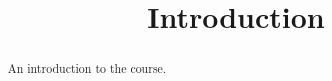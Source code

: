 \documentclass{ximera}
\title{Introduction}
\begin{document}
  
\begin{abstract}  
An introduction to the course.
\end{abstract}  
\maketitle  
\end{document}
